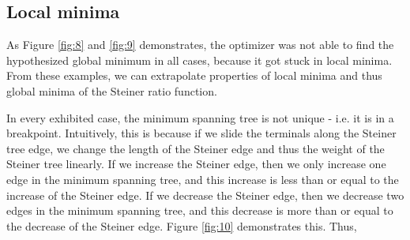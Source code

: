 \documentclass{mpaper}
\begin{document}
\subsection{Local minima}

As Figure \ref{fig:8} and \ref{fig:9} demonstrates, the optimizer was not able to find the hypothesized global minimum in all cases, because it got stuck in local minima. From these examples, we can extrapolate properties of local minima and thus global minima of the Steiner ratio function.

In every exhibited case, the minimum spanning tree is not unique - i.e. it is in a breakpoint. Intuitively, this is because if we slide the terminals along the Steiner tree edge, we change the length of the Steiner edge and thus the weight of the Steiner tree linearly. If we increase the Steiner edge, then we only increase one edge in the minimum spanning tree, and this increase is less than or equal to the increase of the Steiner edge. If we decrease the Steiner edge, then we decrease two edges in the minimum spanning tree, and this decrease is more than or equal to the decrease of the Steiner edge. Figure \ref{fig:10} demonstrates this. Thus, 
\end{document}
